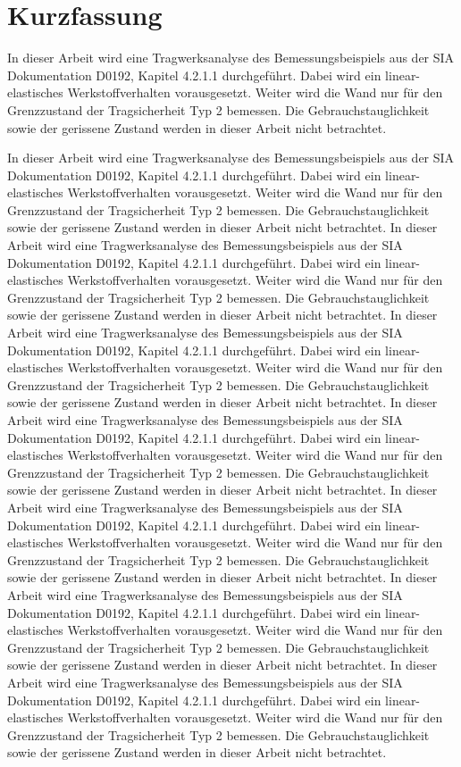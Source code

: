 \chapter*{Kurzfassung}

In dieser Arbeit wird eine Tragwerksanalyse des Bemessungsbeispiels aus
der SIA Dokumentation D0192, Kapitel 4.2.1.1 durchgeführt. Dabei wird
ein linear-elastisches Werkstoffverhalten vorausgesetzt. Weiter wird die
Wand nur für den Grenzzustand der Tragsicherheit Typ 2 bemessen. Die
Gebrauchstauglichkeit sowie der gerissene Zustand werden in dieser
Arbeit nicht betrachtet.

In dieser Arbeit wird eine Tragwerksanalyse des Bemessungsbeispiels aus
der SIA Dokumentation D0192, Kapitel 4.2.1.1 durchgeführt. Dabei wird
ein linear-elastisches Werkstoffverhalten vorausgesetzt. Weiter wird die
Wand nur für den Grenzzustand der Tragsicherheit Typ 2 bemessen. Die
Gebrauchstauglichkeit sowie der gerissene Zustand werden in dieser
Arbeit nicht betrachtet.
In dieser Arbeit wird eine Tragwerksanalyse des Bemessungsbeispiels aus
der SIA Dokumentation D0192, Kapitel 4.2.1.1 durchgeführt. Dabei wird
ein linear-elastisches Werkstoffverhalten vorausgesetzt. Weiter wird die
Wand nur für den Grenzzustand der Tragsicherheit Typ 2 bemessen. Die
Gebrauchstauglichkeit sowie der gerissene Zustand werden in dieser
Arbeit nicht betrachtet.
In dieser Arbeit wird eine Tragwerksanalyse des Bemessungsbeispiels aus
der SIA Dokumentation D0192, Kapitel 4.2.1.1 durchgeführt. Dabei wird
ein linear-elastisches Werkstoffverhalten vorausgesetzt. Weiter wird die
Wand nur für den Grenzzustand der Tragsicherheit Typ 2 bemessen. Die
Gebrauchstauglichkeit sowie der gerissene Zustand werden in dieser
Arbeit nicht betrachtet.
In dieser Arbeit wird eine Tragwerksanalyse des Bemessungsbeispiels aus
der SIA Dokumentation D0192, Kapitel 4.2.1.1 durchgeführt. Dabei wird
ein linear-elastisches Werkstoffverhalten vorausgesetzt. Weiter wird die
Wand nur für den Grenzzustand der Tragsicherheit Typ 2 bemessen. Die
Gebrauchstauglichkeit sowie der gerissene Zustand werden in dieser
Arbeit nicht betrachtet.
In dieser Arbeit wird eine Tragwerksanalyse des Bemessungsbeispiels aus
der SIA Dokumentation D0192, Kapitel 4.2.1.1 durchgeführt. Dabei wird
ein linear-elastisches Werkstoffverhalten vorausgesetzt. Weiter wird die
Wand nur für den Grenzzustand der Tragsicherheit Typ 2 bemessen. Die
Gebrauchstauglichkeit sowie der gerissene Zustand werden in dieser
Arbeit nicht betrachtet.
In dieser Arbeit wird eine Tragwerksanalyse des Bemessungsbeispiels aus
der SIA Dokumentation D0192, Kapitel 4.2.1.1 durchgeführt. Dabei wird
ein linear-elastisches Werkstoffverhalten vorausgesetzt. Weiter wird die
Wand nur für den Grenzzustand der Tragsicherheit Typ 2 bemessen. Die
Gebrauchstauglichkeit sowie der gerissene Zustand werden in dieser
Arbeit nicht betrachtet.
In dieser Arbeit wird eine Tragwerksanalyse des Bemessungsbeispiels aus
der SIA Dokumentation D0192, Kapitel 4.2.1.1 durchgeführt. Dabei wird
ein linear-elastisches Werkstoffverhalten vorausgesetzt. Weiter wird die
Wand nur für den Grenzzustand der Tragsicherheit Typ 2 bemessen. Die
Gebrauchstauglichkeit sowie der gerissene Zustand werden in dieser
Arbeit nicht betrachtet.
